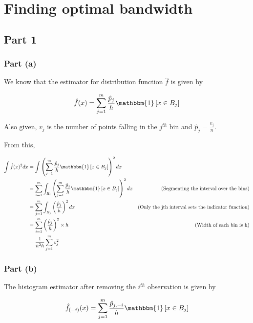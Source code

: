 \section{Finding optimal bandwidth}

\subsection{Part 1}
\subsubsection{Part (a)}

We know that the estimator for distribution function $\hat{f}$ is given by

\begin{equation}
    \hat{f}(x) = \sum_{j=1}^m \frac{\hat{p}_j}{h} \mathbbm{1}\left[x \in B_j\right]
\end{equation}

Also given, $v_j$ is the number of points falling in the $j^{th}$ bin and $\hat{p}_j = \frac{v_j}{n}$.

From this,

\begin{align*}
    \int \hat{f}(x)^2 dx &= \int \left(\sum_{j=1}^m \frac{\hat{p}_j}{h} \mathbbm{1}\left[x \in B_j\right]\right)^2 dx \\
    &= \sum_{i=1}^m \int_{B_i} \left(\sum_{j=1}^m \frac{\hat{p}_j}{h} \mathbbm{1}\left[x \in B_j\right]\right)^2 dx &\text{(Segmenting the interval over the bins)}\\
    &= \sum_{j=1}^m \int_{B_j} \left(\frac{\hat{p}_j}{h}\right)^2 dx &\text{(Only the jth interval sets the indicator function)}\\
    &= \sum_{i=1}^m \left(\frac{\hat{p}_j}{h}\right)^2 \times h &\text{(Width of each bin is h)}\\
    &= \frac{1}{n^2h} \sum_{j=1}^m v_j^2
\end{align*}

\subsubsection{Part (b)}

The histogram estimator after removing the $i^{th}$ observation is given by

\begin{equation}
    \hat{f}_{(-i)}(x) = \sum_{j=1}^m \frac{\hat{p}_{j, -i}}{h} \mathbbm{1}\left[x \in B_j\right]
\end{equation}

